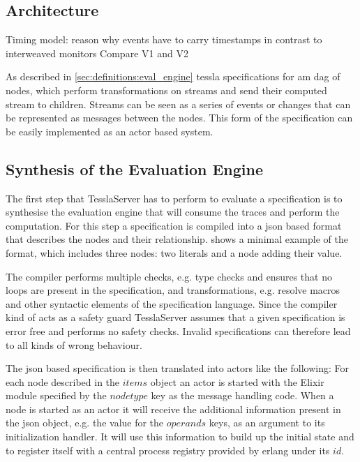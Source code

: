 \subsection{Architecture}
\label{sec:implementation:tesslaserver:architecture}

Timing model: reason why events have to carry timestamps in contrast to interweaved monitors
Compare V1 and V2

As described in \cref{sec:definitions:eval_engine} \gls{tessla} specifications for am \gls{dag} of nodes, which perform transformations on streams and send their computed stream to children.
Streams can be seen as a series of events or changes that can be represented as messages between the nodes.
This form of the specification can be easily implemented as an actor based system.

\subsection{Synthesis of the Evaluation Engine}

The first step that TesslaServer has to perform to evaluate a specification is to synthesise the evaluation engine that will consume the traces and perform the computation.
For this step a specification is compiled into a \gls{json} based format that describes the nodes and their relationship.
 shows a minimal example of the format, which includes three nodes: two literals and a node adding their value.



The compiler performs multiple checks, e.g. type checks and ensures that no loops are present in the specification, and transformations, e.g. resolve macros and other syntactic elements of the specification language.
Since the compiler kind of acts as a safety guard TesslaServer assumes that a given specification is error free and performs no safety checks.
Invalid specifications can therefore lead to all kinds of wrong behaviour.

The \gls{json} based specification is then translated into actors like the following: For each node described in the \(\mathit{items}\) object an actor is started with the Elixir module specified by the \(\mathit{nodetype}\) key as the message handling code.
When a node is started as an actor it will receive the additional information present in the \gls{json} object, e.g. the value for the \(\mathit{operands}\) keys, as an argument to its initialization handler.
It will use this information to build up the initial state and to register itself with a central process registry provided by erlang under its \(\mathit{id}\).

